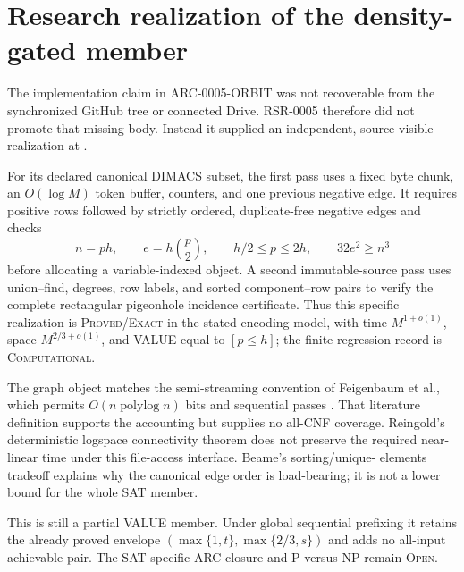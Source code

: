 \section{Research realization of the density-gated member}
The implementation claim in ARC-0005-ORBIT was not recoverable from the
synchronized GitHub tree or connected Drive.  RSR-0005 therefore did not
promote that missing body.  Instead it supplied an independent, source-visible
realization at
.

For its declared canonical DIMACS subset, the first pass uses a fixed byte
chunk, an $O(\log M)$ token buffer, counters, and one previous negative edge.
It requires positive rows followed by strictly ordered, duplicate-free
negative edges and checks
\[
 n=ph,\qquad e=h\binom p2,\qquad h/2\le p\le2h,
 \qquad 32e^2\ge n^3
\]
before allocating a variable-indexed object.  A second immutable-source pass
uses union--find, degrees, row labels, and sorted component--row pairs to
verify the complete rectangular pigeonhole incidence certificate.  Thus this
specific realization is \textsc{Proved/Exact} in the stated encoding model,
with time $M^{1+o(1)}$, space $M^{2/3+o(1)}$, and VALUE equal to
$[p\le h]$; the finite regression record is \textsc{Computational}.

The graph object matches the semi-streaming convention of Feigenbaum et al.,
which permits $O(n\operatorname{polylog}n)$ bits and sequential passes
\cite{rsr0005Semistream}.  That literature definition supports the accounting
but supplies no all-CNF coverage.  Reingold's deterministic logspace
connectivity theorem \cite{rsr0005Reingold} does not preserve the required
near-linear time under this file-access interface.  Beame's sorting/unique-
elements tradeoff \cite{rsr0005Beame} explains why the canonical edge order
is load-bearing; it is not a lower bound for the whole SAT member.

This is still a partial VALUE member.  Under global sequential prefixing it
retains the already proved envelope
$(\max\{1,t\},\max\{2/3,s\})$ and adds no all-input achievable pair.
The SAT-specific ARC closure and P versus NP remain \textsc{Open}.
